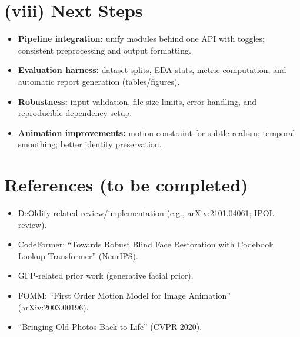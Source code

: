 \documentclass[10pt,twocolumn,letterpaper]{article}
\begin{document}
\section{(viii) Next Steps}
\begin{itemize}[leftmargin=*]
  \item \textbf{Pipeline integration:} unify modules behind one API with toggles; consistent preprocessing and output formatting.
  \item \textbf{Evaluation harness:} dataset splits, EDA stats, metric computation, and automatic report generation (tables/figures).
  \item \textbf{Robustness:} input validation, file-size limits, error handling, and reproducible dependency setup.
  \item \textbf{Animation improvements:} motion constraint for subtle realism; temporal smoothing; better identity preservation.
\end{itemize}

\section*{References (to be completed)}
\begin{itemize}[leftmargin=*]
  \item DeOldify-related review/implementation (e.g., arXiv:2101.04061; IPOL review).
  \item CodeFormer: ``Towards Robust Blind Face Restoration with Codebook Lookup Transformer'' (NeurIPS).
  \item GFP-related prior work (generative facial prior).
  \item FOMM: ``First Order Motion Model for Image Animation'' (arXiv:2003.00196).
  \item ``Bringing Old Photos Back to Life'' (CVPR 2020).
\end{itemize}
\end{document}
